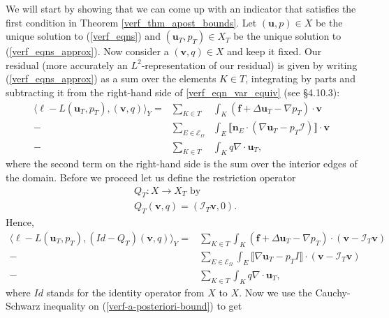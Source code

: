 \documentclass[12pt,a4paper]{article}
\theoremstyle{definition}
\begin{document}
We will start by showing that we can come up with an indicator that satisfies the first condition in Theorem \ref{verf_thm_apost_bounds}.  Let $\left(\textbf{u},p\right)\in X$ be the unique solution to (\ref{verf_eqns}) and $\left(\textbf{u}_T,p_T\right)\in X_T$ be the unique solution to (\ref{verf_eqns_approx}).  Now consider a $\left(\textbf{v},q\right)\in X$ and keep it fixed.  Our residual (more accurately an $L^2$-representation of our residual) is given by writing (\ref{verf_eqns_approx}) as a sum over the elements $K\in T$, integrating by parts and subtracting it from the right-hand side of \ref{verf_eqn_var_equiv} (see \cite{verfurth2013posteriori} \S 4.10.3):
\begin{eqnarray}\label{L2-rep-residual}
\langle \ell -L\left(\textbf{u}_T,p_T\right),\left(\textbf{v},q\right) \rangle_Y= &\sum_{K\in T}&\int_{K}\left(\textbf{f}+\Delta \textbf{u}_T-\nabla p_T\right)\cdot \textbf{v}\nonumber\\-&\sum_{E\in \mathcal{E}_{\Omega}}&\int_{E}\llbracket\textbf{n}_E\cdot\left(\nabla \textbf{u}_T-p_T\mathcal{I}\right)\rrbracket \cdot \textbf{v}\\
-&\sum_{K\in T}&\int_{K}q \nabla \cdot \textbf{u}_T, \nonumber
\end{eqnarray}
where the second term on the right-hand side is the sum over the interior edges of the domain.   Before we proceed let us define the restriction operator 
\begin{equation}
\begin{aligned}
&Q_T:X\rightarrow X_T\text{ by}\\
&Q_T\left(\textbf{v},q\right)=\left(\mathcal{I}_T\textbf{v},0\right).
\end{aligned}
\end{equation}
Hence,
\begin{equation}\label{verf-a-posteriori-bound}
\begin{aligned}
\langle \ell -L\left(\textbf{u}_T,p_T\right),\left(Id-Q_T\right)\left(\textbf{v},q\right) \rangle_Y= &\sum_{K\in T}\int_{K}\left(\textbf{f}+\Delta \textbf{u}_T-\nabla p_T\right)\cdot \left(\textbf{v}-\mathcal{I}_T\textbf{v}\right)\\-&\sum_{E\in \mathcal{E}_{\Omega}}\int_{E}\llbracket\nabla \textbf{u}_T-p_TI\rrbracket \cdot \left(\textbf{v}-\mathcal{I}_T\textbf{v}\right)\\
-&\sum_{K\in T}\int_{K}q \nabla \cdot \textbf{u}_T, 
\end{aligned}
\end{equation}
where $Id$ stands for the identity operator from $X$ to $X$.  Now we use the Cauchy-Schwarz inequality on (\ref{verf-a-posteriori-bound}) to get
\end{document}
